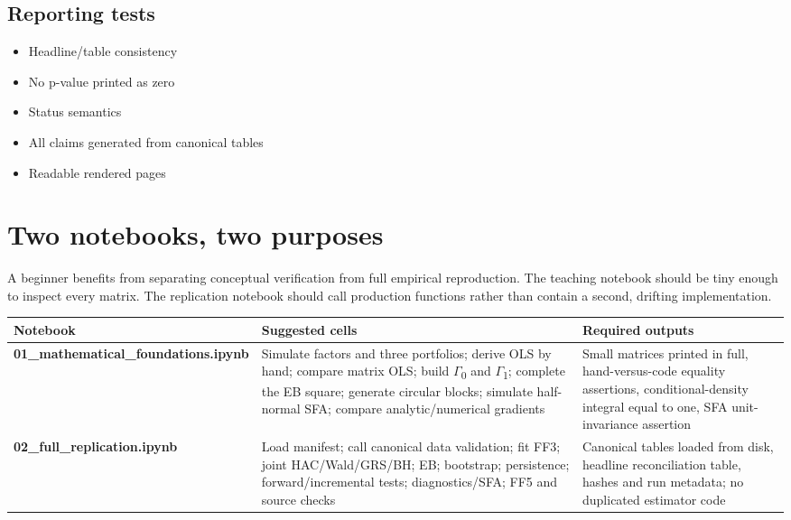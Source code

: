 \hypertarget{reporting-tests}{%
\subsection{Reporting tests}\label{reporting-tests}}

\begin{itemize}
\tightlist
\item
  Headline/table consistency
\item
  No p-value printed as zero
\item
  Status semantics
\item
  All claims generated from canonical tables
\item
  Readable rendered pages
\end{itemize}

\hypertarget{two-notebooks-two-purposes}{%
\section{Two notebooks, two purposes}\label{two-notebooks-two-purposes}}

A beginner benefits from separating conceptual verification from full
empirical reproduction. The teaching notebook should be tiny enough to
inspect every matrix. The replication notebook should call production
functions rather than contain a second, drifting implementation.

\begin{longtable}[]{@{}p{}p{}p{}@{}}
\toprule\noalign{}
Notebook & Suggested cells & Required outputs \\
\midrule\noalign{}
\endhead
\bottomrule\noalign{}
\endlastfoot
\textbf{01\_mathematical\_foundations.ipynb} & Simulate factors and
three portfolios; derive OLS by hand; compare matrix OLS; build
\ensuremath{\Gamma }\textsubscript{0} and \ensuremath{\Gamma }\textsubscript{1}; complete the EB square;
generate circular blocks; simulate half-normal SFA; compare
analytic/numerical gradients & Small matrices printed in full,
hand-versus-code equality assertions, conditional-density integral equal
to one, SFA unit-invariance assertion \\
\textbf{02\_full\_replication.ipynb} & Load manifest; call canonical
data validation; fit FF3; joint HAC/Wald/GRS/BH; EB; bootstrap;
persistence; forward/incremental tests; diagnostics/SFA; FF5 and source
checks & Canonical tables loaded from disk, headline reconciliation
table, hashes and run metadata; no duplicated estimator code \\
\end{longtable}

